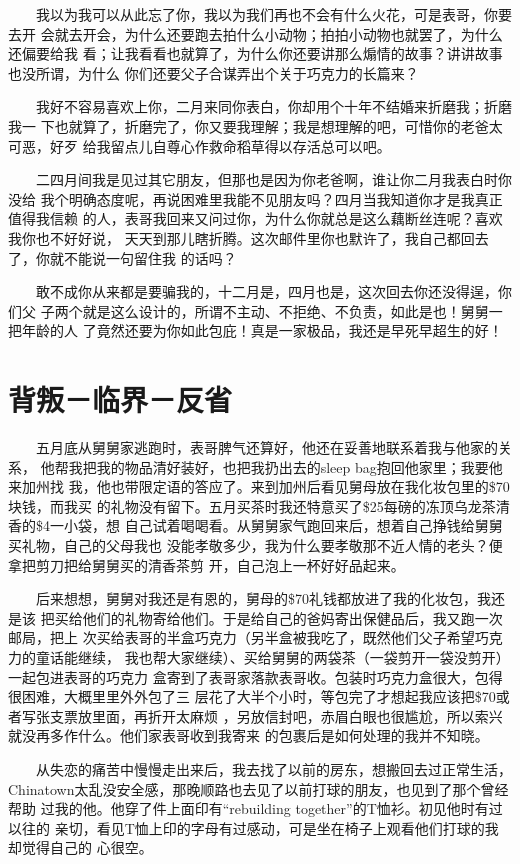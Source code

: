 \documentclass[12pt]{book}
\begin{document}
　　我以为我可以从此忘了你，我以为我们再也不会有什么火花，可是表哥，你要去开
会就去开会，为什么还要跑去拍什么小动物；拍拍小动物也就罢了，为什么还偏要给我
看；让我看看也就算了，为什么你还要讲那么煽情的故事？讲讲故事也没所谓，为什么
你们还要父子合谋弄出个关于巧克力的长篇来？

　　我好不容易喜欢上你，二月来同你表白，你却用个十年不结婚来折磨我；折磨我一
下也就算了，折磨完了，你又要我理解；我是想理解的吧，可惜你的老爸太可恶，好歹
给我留点儿自尊心作救命稻草得以存活总可以吧。

　　二四月间我是见过其它朋友，但那也是因为你老爸啊，谁让你二月我表白时你没给
我个明确态度呢，再说困难里我能不见朋友吗？四月当我知道你才是我真正值得我信赖
的人，表哥我回来又问过你，为什么你就总是这么藕断丝连呢？喜欢我你也不好好说，
天天到那儿瞎折腾。这次邮件里你也默许了，我自己都回去了，你就不能说一句留住我
的话吗？

　　敢不成你从来都是要骗我的，十二月是，四月也是，这次回去你还没得逞，你们父
子两个就是这么设计的，所谓不主动、不拒绝、不负责，如此是也！舅舅一把年龄的人
了竟然还要为你如此包庇！真是一家极品，我还是早死早超生的好！
\section{背叛－临界－反省}
\label{sec-8-22}

　　五月底从舅舅家逃跑时，表哥脾气还算好，他还在妥善地联系着我与他家的关系，
他帮我把我的物品清好装好，也把我扔出去的sleep bag抱回他家里；我要他来加州找
我，他也带限定语的答应了。来到加州后看见舅母放在我化妆包里的\$70块钱，而我买
的礼物没有留下。五月买茶时我还特意买了\$25每磅的冻顶乌龙茶清香的\$4一小袋，想
自己试着喝喝看。从舅舅家气跑回来后，想着自己挣钱给舅舅买礼物，自己的父母我也
没能孝敬多少，我为什么要孝敬那不近人情的老头？便拿把剪刀把给舅舅买的清香茶剪
开，自己泡上一杯好好品起来。

　　后来想想，舅舅对我还是有恩的，舅母的\$70礼钱都放进了我的化妆包，我还是该
把买给他们的礼物寄给他们。于是给自己的爸妈寄出保健品后，我又跑一次邮局，把上
次买给表哥的半盒巧克力（另半盒被我吃了，既然他们父子希望巧克力的童话能继续，
我也帮大家继续）、买给舅舅的两袋茶（一袋剪开一袋没剪开）一起包进表哥的巧克力
盒寄到了表哥家落款表哥收。包装时巧克力盒很大，包得很困难，大概里里外外包了三
层花了大半个小时，等包完了才想起我应该把\$70或者写张支票放里面，再折开太麻烦
，另放信封吧，赤眉白眼也很尴尬，所以索兴就没再多作什么。他们家表哥收到我寄来
的包裹后是如何处理的我并不知晓。

　　从失恋的痛苦中慢慢走出来后，我去找了以前的房东，想搬回去过正常生活，
Chinatown太乱没安全感，那晚顺路也去见了以前打球的朋友，也见到了那个曾经帮助
过我的他。他穿了件上面印有“rebuilding together”的T恤衫。初见他时有过以往的
亲切，看见T恤上印的字母有过感动，可是坐在椅子上观看他们打球的我却觉得自己的
心很空。
\end{document}
